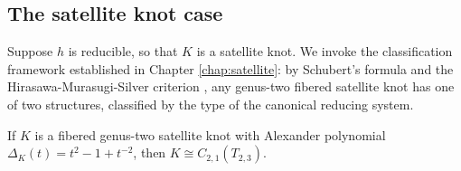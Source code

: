 \subsection{The satellite knot case}\label{subsec:cable_satellite}

Suppose $h$ is reducible, so that $K$ is a satellite knot.  We invoke the classification framework established in Chapter \ref{chap:satellite}: by Schubert's formula and the Hirasawa-Murasugi-Silver criterion \cite{HirasawaMurasugiSilver2008}, any genus-two fibered satellite knot has one of two structures, classified by the type of the canonical reducing system.

\begin{lemma}\label{lem:cable_satellite_classification}
If $K$ is a fibered genus-two satellite knot with Alexander polynomial $\Delta_K(t) = t^2 - 1 + t^{-2}$, then $K \cong C_{2,1}(T_{2,3})$.
\end{lemma}

